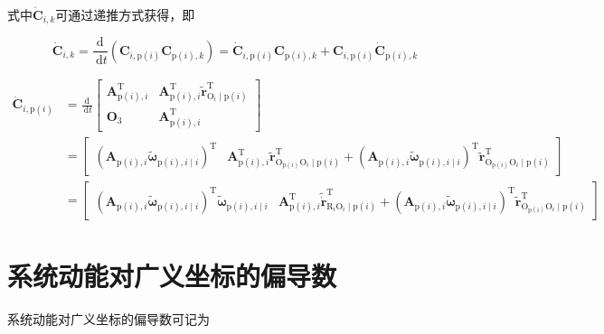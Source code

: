 式中$\dot{\boldsymbol{C}}_{i,k}$可通过递推方式获得，即

\[
\dot{\boldsymbol{C}}_{i, k}=\frac{\mathrm{d}}{\mathrm{~d} t}\left(\boldsymbol{C}_{i, \mathrm{p}(i)} \boldsymbol{C}_{\mathrm{p}(i), k}\right)=\dot{\boldsymbol{C}}_{i, \mathrm{p}(i)} \boldsymbol{C}_{\mathrm{p}(i), k}+\boldsymbol{C}_{i, \mathrm{p}(i)} \dot{\boldsymbol{C}}_{\mathrm{p}(i), k}
\]

\[
\begin{aligned}
\dot{\boldsymbol{C}}_{i, \mathrm{p}(i)} & =\frac{\mathrm{d}}{\mathrm{~d} t}\left[\begin{array}{cc}
\boldsymbol{A}_{\mathrm{p}(i), i}^{\mathrm{T}} & \boldsymbol{A}_{\mathrm{p}(i), i}^{\mathrm{T}} \tilde{\boldsymbol{r}}_{\mathrm{O}_{i} \mid \mathrm{p}(i)}^{\mathrm{T}} \\
\boldsymbol{O}_{3} & \boldsymbol{A}_{\mathrm{p}(i), i}^{\mathrm{T}}
\end{array}\right] \\
& =\left[\begin{array}{cc}
\left(\boldsymbol{A}_{\mathrm{p}(i), i} \tilde{\boldsymbol{\omega}}_{\mathrm{p}(i), i \mid i}\right)^{\mathrm{T}} & \boldsymbol{A}_{\mathrm{p}(i), i}^{\mathrm{T}} \tilde{\boldsymbol{r}}_{\mathrm{O}_{\mathrm{p}(i)} \mathrm{O}_{i} \mid \mathrm{p}(i)}^{\mathrm{T}}+\left(\boldsymbol{A}_{\mathrm{p}(i), i} \tilde{\boldsymbol{\omega}}_{\mathrm{p}(i), i \mid i}\right)^{\mathrm{T}} \tilde{\boldsymbol{r}}_{\mathrm{O}_{\mathrm{p}(i)} \mathrm{O}_{i} \mid \mathrm{p}(i)}^{\mathrm{T}}
\end{array}\right] \\
& =\left[\begin{array}{cc}
\left(\boldsymbol{A}_{\mathrm{p}(i), i} \tilde{\boldsymbol{\omega}}_{\mathrm{p}(i), i \mid i}\right)^{\mathrm{T}} \tilde{\boldsymbol{\omega}}_{\mathrm{p}(i), i \mid i} & \boldsymbol{A}_{\mathrm{p}(i), i}^{\mathrm{T}} \tilde{\dot{\boldsymbol{r}}}_{\mathrm{R}_{i} \mathrm{O}_{i} \mid \mathrm{p}(i)}^{\mathrm{T}}+\left(\boldsymbol{A}_{\mathrm{p}(i), i} \tilde{\boldsymbol{\omega}}_{\mathrm{p}(i), i \mid i}\right)^{\mathrm{T}} \tilde{\boldsymbol{r}}_{\mathrm{O}_{\mathrm{p}(i)} \mathrm{O}_{i} \mid \mathrm{p}(i)}^{\mathrm{T}}
\end{array}\right] 
\end{aligned}
\]
\section{系统动能对广义坐标的偏导数}
系统动能对广义坐标的偏导数可记为

